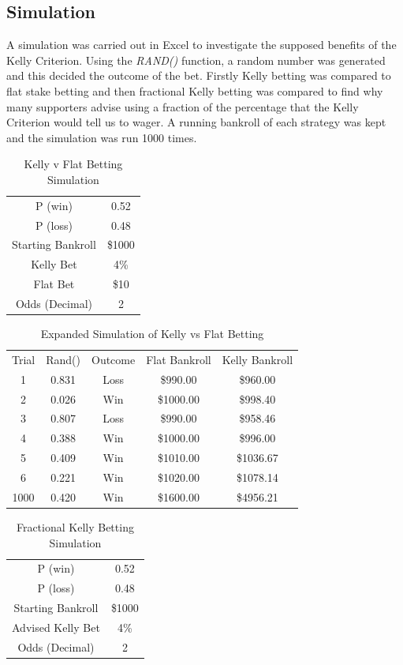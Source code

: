 \documentclass[12pt]{article}
\begin{document}
\subsection{Simulation}
A simulation was carried out in Excel to investigate the supposed benefits of the Kelly Criterion. Using the \emph{RAND()} function, a random number was generated and this decided the outcome of the bet. Firstly Kelly betting was compared to flat stake betting and then fractional Kelly betting was compared to find why many supporters advise using a fraction of the percentage that the Kelly Criterion would tell us to wager. A running bankroll of each strategy was kept and the simulation was run 1000 times.

\begin{table}[H]
\centering
\begin{tabular}{cc}
P (win)           & 0.52   \\
P (loss)          & 0.48   \\
Starting Bankroll & \$1000 \\
Kelly Bet         & 4\%    \\
Flat Bet          & \$10   \\
Odds (Decimal)    & 2     
\end{tabular}
\caption{Kelly v Flat Betting Simulation}
\end{table}

\begin{table}[H]
\centering
\begin{tabular}{ccccc}
Trial & Rand() & Outcome & Flat Bankroll & Kelly Bankroll \\
1     & 0.831  & Loss    & \$990.00      & \$960.00       \\
2     & 0.026  & Win     & \$1000.00     & \$998.40       \\
3     & 0.807  & Loss    & \$990.00      & \$958.46       \\
4     & 0.388  & Win     & \$1000.00     & \$996.00       \\
5     & 0.409  & Win     & \$1010.00     & \$1036.67      \\
6     & 0.221  & Win     & \$1020.00     & \$1078.14      \\
1000  & 0.420  & Win     & \$1600.00     & \$4956.21     
\end{tabular}
\caption{Expanded Simulation of Kelly vs Flat Betting}
\end{table}

\begin{table}[H]
\centering
\begin{tabular}{cc}
P (win)           & 0.52   \\
P (loss)          & 0.48   \\
Starting Bankroll & \$1000 \\
Advised Kelly Bet         & 4\%    \\
Odds (Decimal)    & 2     
\end{tabular}
\caption{Fractional Kelly Betting Simulation}
\end{table}
\end{document}
